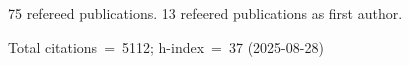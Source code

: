 75 refereed publications. 13 refeered publications as first author.

Total citations~=~5112; h-index~=~37 (2025-08-28)